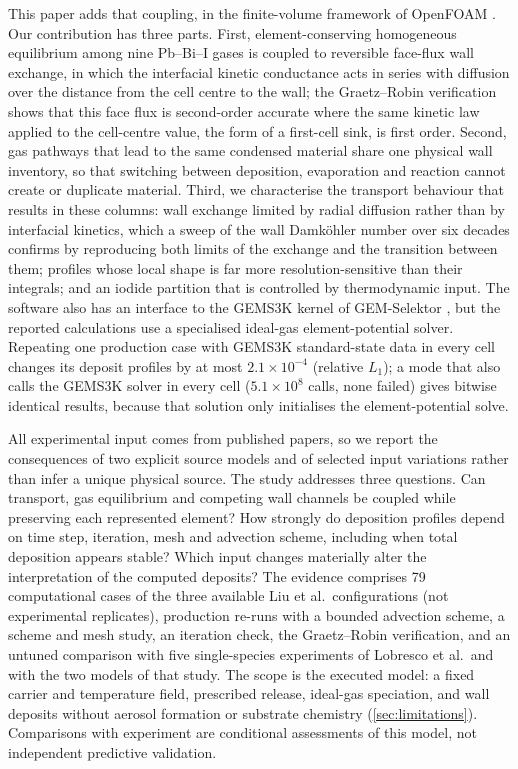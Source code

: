 This paper adds that coupling, in the finite-volume framework of
OpenFOAM \cite{Weller1998tensorial}. Our contribution has three parts.
First, element-conserving homogeneous equilibrium among nine Pb--Bi--I
gases is coupled to reversible face-flux wall exchange, in which the
interfacial kinetic conductance acts in series with diffusion over the
distance from the cell centre to the wall; the Graetz--Robin
verification shows that this face flux is second-order accurate where
the same kinetic law applied to the cell-centre value, the form of a
first-cell sink, is first order. Second, gas pathways that
lead to the same condensed material share one physical wall inventory,
so that switching between deposition, evaporation and reaction cannot
create or duplicate material. Third, we characterise the transport
behaviour that results in these columns: wall exchange limited by
radial diffusion rather than by interfacial kinetics, which a sweep of
the wall Damk\"ohler number over six decades confirms by reproducing
both limits of the exchange and the transition between them; profiles
whose local shape is far more resolution-sensitive than their
integrals; and an iodide partition that is controlled by thermodynamic
input.
The software also has an interface to the GEMS3K kernel of
GEM-Selektor \cite{Kulik2013gemselektor}, but the reported calculations
use a specialised ideal-gas element-potential solver. Repeating one
production case with GEMS3K standard-state data in every cell changes
its deposit profiles by at most $2.1\times10^{-4}$ (relative $L_1$); a
mode that also calls the GEMS3K solver in every cell
($5.1\times10^{8}$ calls, none failed) gives bitwise identical results,
because that solution only initialises the element-potential solve.

All experimental input comes from published papers, so we report the
consequences of two explicit source models and of selected input
variations rather than infer a unique physical source. The study addresses three questions. Can
transport, gas equilibrium and competing wall channels be coupled while
preserving each represented element? How strongly do deposition
profiles depend on time step, iteration, mesh and advection scheme,
including when total deposition appears stable? Which input changes
materially alter the interpretation of the computed deposits? The
evidence comprises 79 computational cases of the three available Liu et
al.\ configurations (not experimental replicates), production re-runs
with a bounded advection scheme, a scheme and mesh study, an iteration
check, the Graetz--Robin verification, and an untuned comparison with
five single-species experiments of Lobresco et al.\ and with the two
models of that study. The scope is the executed model: a fixed carrier
and temperature field, prescribed release, ideal-gas speciation, and
wall deposits without aerosol formation or substrate chemistry
(\cref{sec:limitations}). Comparisons with experiment are conditional
assessments of this model, not independent predictive validation.

